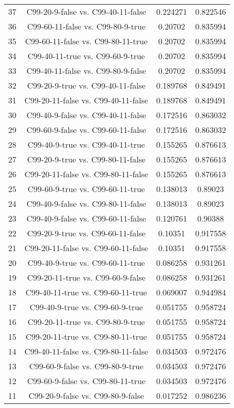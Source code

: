 \documentclass[a4paper,10pt]{article}
\begin{document}
\begin{landscape}
\begin{table}[!htp]
\begin{tabular}{cccc}
37&C99-20-9-false vs. C99-40-11-false&0.224271&0.822546\\
36&C99-60-11-false vs. C99-80-9-true&0.20702&0.835994\\
35&C99-60-11-false vs. C99-80-11-true&0.20702&0.835994\\
34&C99-40-11-true vs. C99-60-9-true&0.20702&0.835994\\
33&C99-40-11-false vs. C99-80-9-false&0.20702&0.835994\\
32&C99-20-9-true vs. C99-40-11-false&0.189768&0.849491\\
31&C99-20-11-false vs. C99-40-11-false&0.189768&0.849491\\
30&C99-40-9-false vs. C99-40-11-false&0.172516&0.863032\\
29&C99-60-9-false vs. C99-60-11-false&0.172516&0.863032\\
28&C99-40-9-true vs. C99-40-11-true&0.155265&0.876613\\
27&C99-20-9-true vs. C99-80-11-false&0.155265&0.876613\\
26&C99-20-11-false vs. C99-80-11-false&0.155265&0.876613\\
25&C99-60-9-true vs. C99-60-11-true&0.138013&0.89023\\
24&C99-40-9-false vs. C99-80-11-false&0.138013&0.89023\\
23&C99-40-9-false vs. C99-60-11-false&0.120761&0.90388\\
22&C99-20-9-true vs. C99-60-11-false&0.10351&0.917558\\
21&C99-20-11-false vs. C99-60-11-false&0.10351&0.917558\\
20&C99-40-9-true vs. C99-60-11-true&0.086258&0.931261\\
19&C99-20-11-true vs. C99-60-9-false&0.086258&0.931261\\
18&C99-40-11-true vs. C99-60-11-true&0.069007&0.944984\\
17&C99-40-9-true vs. C99-60-9-true&0.051755&0.958724\\
16&C99-20-11-true vs. C99-80-9-true&0.051755&0.958724\\
15&C99-20-11-true vs. C99-80-11-true&0.051755&0.958724\\
14&C99-40-11-false vs. C99-80-11-false&0.034503&0.972476\\
13&C99-60-9-false vs. C99-80-9-true&0.034503&0.972476\\
12&C99-60-9-false vs. C99-80-11-true&0.034503&0.972476\\
11&C99-20-9-false vs. C99-80-9-false&0.017252&0.986236\\

\end{tabular}
\end{table}
\end{landscape}
\end{document}
